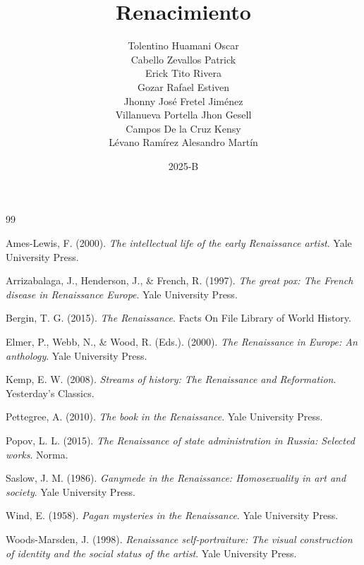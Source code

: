 \documentclass[12pt,a4paper]{report}
\title{Renacimiento}
\author{Tolentino Huamani Oscar\\Cabello Zevallos Patrick\\Erick Tito Rivera\\Gozar Rafael Estiven\\Jhonny José Fretel Jiménez\\Villanueva Portella Jhon Gesell\\Campos De la Cruz Kensy\\Lévano Ramírez Alesandro Martín}
\date{2025-B}
\begin{document}

\clearpage
{}
\tableofcontents
\clearpage
{}







\begin{thebibliography}{99}

 Ames-Lewis, F. (2000). \emph{The intellectual life of the early Renaissance artist}. Yale University Press.

 Arrizabalaga, J., Henderson, J., \& French, R. (1997). \emph{The great pox: The French disease in Renaissance Europe}. Yale University Press.

 Bergin, T. G. (2015). \emph{The Renaissance}. Facts On File Library of World History.

 Elmer, P., Webb, N., \& Wood, R. (Eds.). (2000). \emph{The Renaissance in Europe: An anthology}. Yale University Press.

 Kemp, E. W. (2008). \emph{Streams of history: The Renaissance and Reformation}. Yesterday's Classics.

 Pettegree, A. (2010). \emph{The book in the Renaissance}. Yale University Press.

 Popov, L. L. (2015). \emph{The Renaissance of state administration in Russia: Selected works}. Norma.

 Saslow, J. M. (1986). \emph{Ganymede in the Renaissance: Homosexuality in art and society}. Yale University Press.

 Wind, E. (1958). \emph{Pagan mysteries in the Renaissance}. Yale University Press.

 Woods-Marsden, J. (1998). \emph{Renaissance self-portraiture: The visual construction of identity and the social status of the artist}. Yale University Press.

\end{thebibliography}
\end{document}
